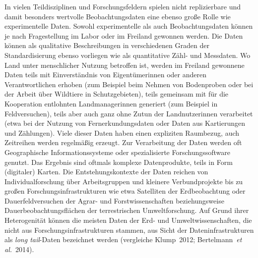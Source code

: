 \documentclass[a4paper,
fontsize=11pt,
oneside,
numbers=noperiodatend,
parskip=half-,
bibliography=totoc,
final
]{scrartcl}
\begin{document}
In vielen Teildisziplinen und Forschungsfeldern spielen nicht
replizierbare und damit besonders wertvolle Beobachtungsdaten eine
ebenso große Rolle wie experimentelle Daten. Sowohl experimentelle als
auch Beobachtungsdaten können je nach Fragestellung im Labor oder im
Freiland gewonnen werden. Die Daten können als qualitative
Beschreibungen in verschiedenen Graden der Standardisierung ebenso
vorliegen wie als quantitative Zähl- und Messdaten. Wo Land unter
menschlicher Nutzung betroffen ist, werden im Freiland gewonnene Daten
teils mit Einverständnis von Eigentümerinnen oder anderen
Verantwortlichen erhoben (zum Beispiel beim Nehmen von Bodenproben oder
bei der Arbeit über Wildtiere in Schutzgebieten), teils gemeinsam mit
für die Kooperation entlohnten Landmanagerinnen generiert (zum Beispiel
in Feldversuchen), teils aber auch ganz ohne Zutun der Landnutzerinnen
verarbeitet (etwa bei der Nutzung von Fernerkundungsdaten oder Daten aus
Kartierungen und Zählungen). Viele dieser Daten haben einen expliziten
Raumbezug, auch Zeitreihen werden regelmäßig erzeugt. Zur Verarbeitung
der Daten werden oft Geographische Informationssysteme oder
spezialisierte Forschungssoftware genutzt. Das Ergebnis sind oftmals
komplexe Datenprodukte, teils in Form (digitaler) Karten. Die
Entstehungskontexte der Daten reichen von Individualforschung über
Arbeitsgruppen und kleinere Verbundprojekte bis zu großen
Forschungsinfrastrukturen wie etwa Satelliten der Erdbeobachtung oder
Dauerfeldversuchen der Agrar- und Forstwissenschaften beziehungsweise
Dauerbeobachtungsflächen der terrestrischen Umweltforschung. Auf Grund
ihrer Heterogenität können die meisten Daten der Erd- und
Umweltwissenschaften, die nicht aus Forschungsinfrastrukturen stammen,
aus Sicht der Dateninfrastrukturen als \emph{long tail}-Daten bezeichnet
werden (vergleiche Klump~2012; Bertelmann~\emph{et al.}~2014).
\end{document}
